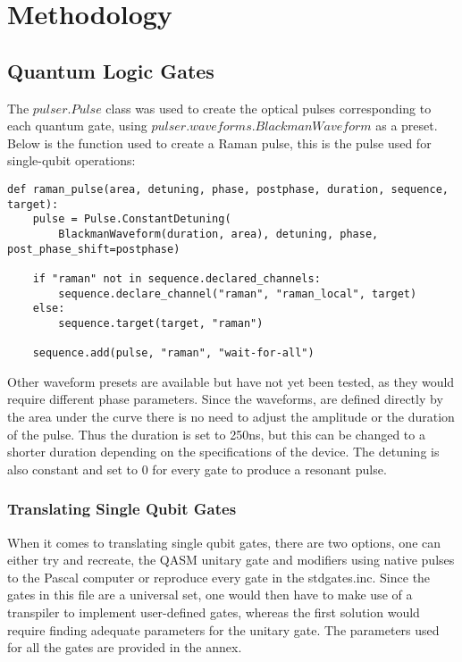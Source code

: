\section{Methodology}
\label{sec:methods}

\subsection{Quantum Logic Gates}
\label{sec:Gates}

The $pulser.Pulse$ class was used to create the optical pulses corresponding to each quantum gate, using $pulser.waveforms.BlackmanWaveform$ as a preset.
Below is the function used to create a Raman pulse, this is the pulse used for single-qubit operations:

\begin{lstlisting}
def raman_pulse(area, detuning, phase, postphase, duration, sequence, target):
    pulse = Pulse.ConstantDetuning(
        BlackmanWaveform(duration, area), detuning, phase, post_phase_shift=postphase)
    
    if "raman" not in sequence.declared_channels:
        sequence.declare_channel("raman", "raman_local", target)
    else:
        sequence.target(target, "raman")

    sequence.add(pulse, "raman", "wait-for-all")
    \end{lstlisting}
Other waveform presets are available but have not yet been tested, as they would require different phase parameters.
Since the waveforms, are defined directly by the area under the curve there is no need to adjust the amplitude or the duration of the pulse.
Thus the duration is set to 250ns, but this can be changed to a shorter duration depending on the specifications of the device.
The detuning is also constant and set to 0 for every gate to produce a resonant pulse.
\subsubsection{Translating Single Qubit Gates}
\label{sec:SingleGatesTranslating}
When it comes to translating single qubit gates, there are two options, one can either try and recreate,
the QASM unitary gate and modifiers using native pulses to the Pascal computer or reproduce every gate in the stdgates.inc. Since the gates in this file are a universal set,
one would then have to make use of a transpiler to implement user-defined gates, whereas the first solution would require finding adequate parameters for the unitary gate.
The parameters used for all the gates are provided in the annex.

